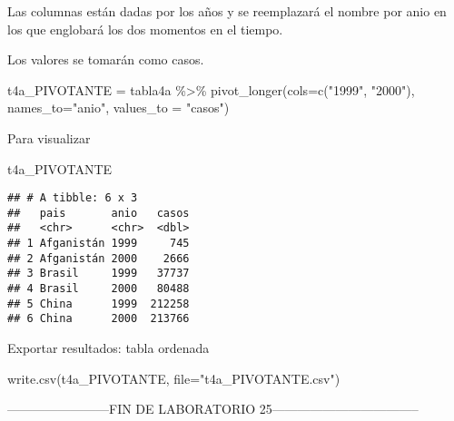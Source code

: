 \documentclass[
]{article}
\newenvironment{Shaded}{\begin{snugshade}}{\end{snugshade}}
\newcommand{\AttributeTok}[1]{\textcolor[rgb]{0.77,0.63,0.00}{#1}}
\newcommand{\FunctionTok}[1]{\textcolor[rgb]{0.00,0.00,0.00}{#1}}
\newcommand{\NormalTok}[1]{#1}
\newcommand{\OtherTok}[1]{\textcolor[rgb]{0.56,0.35,0.01}{#1}}
\newcommand{\SpecialCharTok}[1]{\textcolor[rgb]{0.00,0.00,0.00}{#1}}
\newcommand{\StringTok}[1]{\textcolor[rgb]{0.31,0.60,0.02}{#1}}
\begin{document}
Las columnas están dadas por los años y se reemplazará el nombre por
anio en los que englobará los dos momentos en el tiempo.

Los valores se tomarán como casos.

\begin{Shaded}
\begin{Highlighting}[]
\NormalTok{t4a\_PIVOTANTE }\OtherTok{=}\NormalTok{ tabla4a }\SpecialCharTok{\%\textgreater{}\%}
  \FunctionTok{pivot\_longer}\NormalTok{(}\AttributeTok{cols=}\FunctionTok{c}\NormalTok{(}\StringTok{"1999"}\NormalTok{, }\StringTok{"2000"}\NormalTok{), }\AttributeTok{names\_to=}\StringTok{"anio"}\NormalTok{, }\AttributeTok{values\_to =} \StringTok{"casos"}\NormalTok{)}
\end{Highlighting}
\end{Shaded}

Para visualizar

\begin{Shaded}
\begin{Highlighting}[]
\NormalTok{t4a\_PIVOTANTE}
\end{Highlighting}
\end{Shaded}

\begin{verbatim}
## # A tibble: 6 x 3
##   pais       anio   casos
##   <chr>      <chr>  <dbl>
## 1 Afganistán 1999     745
## 2 Afganistán 2000    2666
## 3 Brasil     1999   37737
## 4 Brasil     2000   80488
## 5 China      1999  212258
## 6 China      2000  213766
\end{verbatim}

Exportar resultados: tabla ordenada

\begin{Shaded}
\begin{Highlighting}[]
\FunctionTok{write.csv}\NormalTok{(t4a\_PIVOTANTE, }\AttributeTok{file=}\StringTok{"t4a\_PIVOTANTE.csv"}\NormalTok{)}
\end{Highlighting}
\end{Shaded}

------------------------FIN DE LABORATORIO
25-----------------------------------
\end{document}

